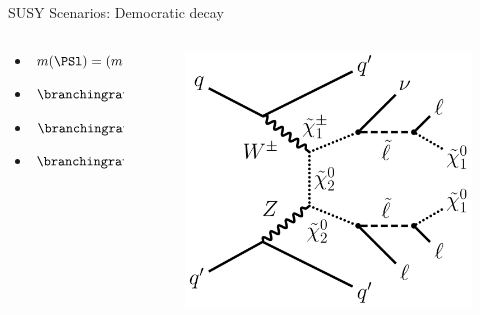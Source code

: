\begin{frame}[fragile]{SUSY Scenarios: Democratic \PSl decay}

  \begin{columns}
    \begin{column}{0.6\textwidth}
      \begin{itemize}
        \item \(m(\PSl) = ( m(\PSGczDt) + m(\PSGczDo) ) / 2 \)
        \item \(\branchingratio(\PSGcpmDo\to\PSl\PGnl) = 1/3 \)
        \item \(\branchingratio( \PSGczDt \to \PSlpm \Plmp ) = 1/3 \)
        \item \(\branchingratio(\PSl \to \PSGczDo \Pl) = 1\)
      \end{itemize}
    \end{column}

    \begin{column}{0.4\textwidth}
      \begin{figure}[htpb]
        \centering
        \includegraphics[width=1.0\textwidth]{fig/scenarios/FeynmanDemocraticSlepton.pdf}
      \end{figure}
    \end{column}
  \end{columns}
\end{frame}

